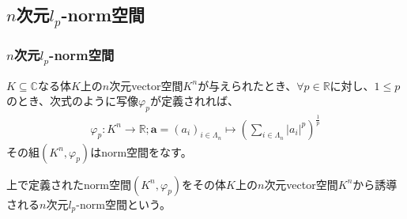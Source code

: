 \documentclass[dvipdfmx]{jsarticle}
\begin{document}
\subsection{$n$次元$l_{p}$-norm空間}%
\subsubsection{$n$次元$l_{p}$-norm空間}%
\begin{thm}\label{2.3.2.1}
$K \subseteq \mathbb{C}$なる体$K$上の$n$次元vector空間$K^{n}$が与えられたとき、$\forall p \in \mathbb{R}$に対し、$1 \leq p$のとき、次式のように写像$\varphi_{p}$が定義されれば、
\begin{align*}
\varphi_{p}:K^{n} \rightarrow \mathbb{R};\mathbf{a} = \left( a_{i} \right)_{i \in \varLambda_{n}} \mapsto \left( \sum_{i \in \varLambda_{n}} \left| a_{i} \right|^{p} \right)^{\frac{1}{p}}
\end{align*}
その組$\left( K^{n},\varphi_{p} \right)$はnorm空間をなす。
\end{thm}
\begin{dfn}
上で定義されたnorm空間$\left( K^{n},\varphi_{p} \right)$をその体$K$上の$n$次元vector空間$K^{n}$から誘導される$n$次元$l_{p}$-norm空間という。
\end{dfn}
\end{document}
